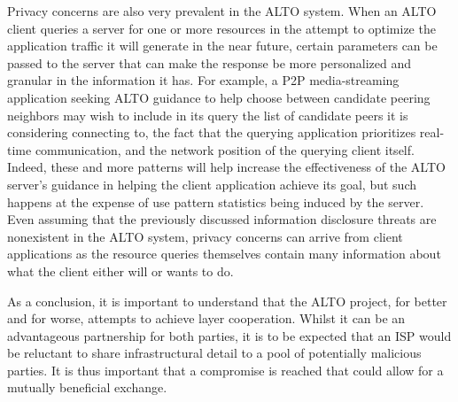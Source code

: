     Privacy concerns are also very prevalent in the ALTO system.
    When an ALTO client queries a server for one or more resources in the attempt to optimize the application traffic it will generate in the near future, certain parameters can be passed to the server that can make the response be more personalized and granular in the information it has.
    For example, a P2P media-streaming application seeking ALTO guidance to help choose between candidate peering neighbors may wish to include in its query the list of candidate peers it is considering connecting to, the fact that the querying application prioritizes real-time communication, and the network position of the querying client itself.
    Indeed, these and more patterns will help increase the effectiveness of the ALTO server's guidance in helping the client application achieve its goal, but such happens at the expense of use pattern statistics being induced by the server.
    Even assuming that the previously discussed information disclosure threats are nonexistent in the ALTO system, privacy concerns can arrive from client applications as the resource queries themselves contain many information about what the client either will or wants to do.


    As a conclusion, it is important to understand that the ALTO project, for better and for worse, attempts to achieve layer cooperation.
    Whilst it can be an advantageous partnership for both parties, it is to be expected that an ISP would be reluctant to share infrastructural detail to a pool of potentially malicious parties.
    It is thus important that a compromise is reached that could allow for a mutually beneficial exchange.

